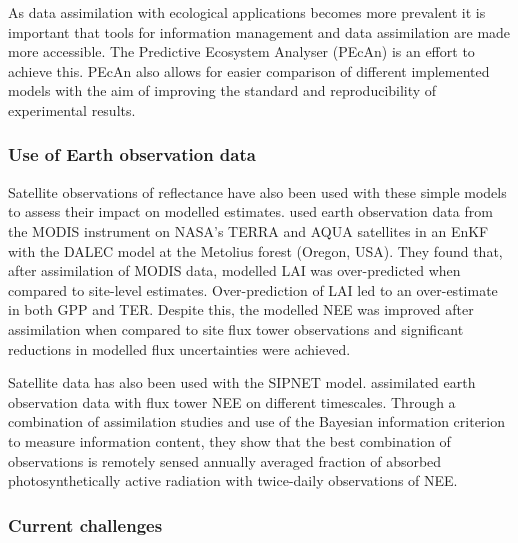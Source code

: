 As data assimilation with ecological applications becomes more prevalent it is important that tools for information management and data assimilation are made more accessible. The Predictive Ecosystem Analyser (PEcAn) is an effort to achieve this. PEcAn also allows for easier comparison of different implemented models \citep{Dietze2013} with the aim of improving the standard and reproducibility of experimental results.

\subsubsection{Use of Earth observation data}

Satellite observations of reflectance have also been used with these simple models to assess their impact on modelled estimates. \citet{Quaife2008} used earth observation data from the MODIS instrument on NASA's TERRA and AQUA satellites in an EnKF with the DALEC model at the Metolius forest (Oregon, USA). They found that, after assimilation of MODIS data, modelled LAI was over-predicted when compared to site-level estimates. Over-prediction of LAI led to an over-estimate in both GPP and TER. Despite this, the modelled NEE was improved after assimilation when compared to site flux tower observations and significant reductions in modelled flux uncertainties were achieved. 

Satellite data has also been used with the SIPNET model. \citet{zobitz2014joint} assimilated earth observation data with flux tower NEE on different timescales. Through a combination of assimilation studies and use of the Bayesian information criterion \citep{schwarz1978estimating} to measure information content, they show that the best combination of observations is remotely sensed annually averaged fraction of absorbed photosynthetically active radiation with twice-daily observations of NEE. 

\subsubsection{Current challenges}    


